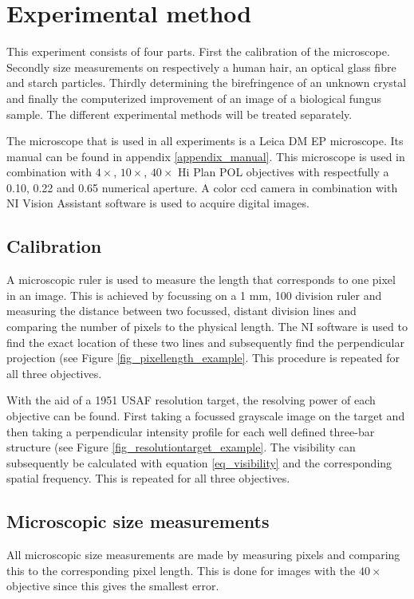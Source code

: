 \section{Experimental method}

This experiment consists of four parts. First the calibration of the microscope. Secondly size measurements on respectively a human hair, an optical glass fibre and starch particles. Thirdly determining the birefringence of an unknown crystal and finally the computerized improvement of an image of a biological fungus sample. The different experimental methods will be treated separately. 

The microscope that is used in all experiments is a Leica DM EP microscope. Its manual can be found in appendix \ref{appendix_manual}. This microscope is used in combination with $4\times$, $10\times$, $40\times$ Hi Plan POL objectives with respectfully a 0.10, 0.22 and 0.65 numerical aperture. A color ccd camera in combination with NI Vision Assistant software is used to acquire digital images.

\subsection{Calibration}
A microscopic ruler is used to measure the length that corresponds to one pixel in an image. This is achieved by focussing on a 1 mm, 100 division ruler and measuring the distance between two focussed, distant division lines and comparing the number of pixels to the physical length. The NI software is used to find the exact location of these two lines and subsequently find the perpendicular projection (see Figure \ref{fig_pixellength_example}. This procedure is repeated for all three objectives.

With the aid of a 1951 USAF resolution target, the resolving power of each objective can be found. First taking a focussed grayscale image  on the target and then taking a perpendicular intensity profile for each well defined three-bar structure (see Figure \ref{fig_resolutiontarget_example}. The visibility can subsequently be calculated with equation \ref{eq_visibility} and the corresponding spatial frequency. This is repeated for all three objectives.

\subsection{Microscopic size measurements}

All microscopic size measurements are made by measuring pixels and comparing this to the corresponding pixel length. This is done for images with the $40\times$ objective since this gives the smallest error.

